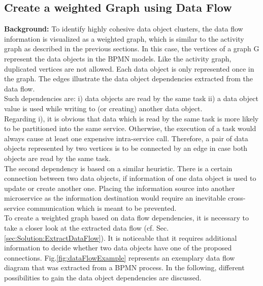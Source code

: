 \subsection{Create a weighted Graph using Data Flow}
\label{sec:Solution:CreateGraphData}
\textbf{Background:} To identify highly cohesive data object clusters, the data flow information is visualized as a weighted graph, which is similar to the activity graph as described in the previous sections. In this case, the vertices of a graph G represent the data objects in the BPMN models. Like the activity graph, duplicated vertices are not allowed. Each data object is only represented once in the graph. The edges illustrate the data object dependencies extracted from the data flow. \\
Such dependencies are: i) data objects are read by the same task ii) a data object value is used while writing to (or creating) another data object. \\
Regarding i), it is obvious that data which is read by the same task is more likely to be partitioned into the same service. Otherwise, the execution of a task would always cause at least one expensive intra-service call.
Therefore, a pair of data objects represented by two vertices is to be connected by an edge in case both objects are read by the same task.\\
The second dependency is based on a similar heuristic. There is a certain connection between two data objects, if information of one data object is used to update or create another one. Placing the information source into another microservice as the information destination would require an inevitable cross-service communication which is meant to be prevented. \\
To create a weighted graph based on data flow dependencies, it is necessary to take a closer look at the extracted data flow (cf. Sec.\ref{sec:Solution:ExtractDataFlow}). It is noticeable that it requires additional information to decide whether two data objects have one of the proposed connections. Fig.\ref{fig:dataFlowExample} represents an exemplary data flow diagram that was extracted from a BPMN process. In the following, different possibilities to gain the data object dependencies are discussed.


